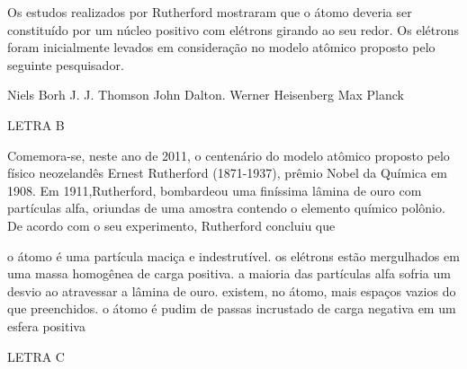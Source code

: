 \documentclass[9qpt]{scrartcl}
\begin{document}
\begin{exercise}[points=1.0]
Os estudos realizados por Rutherford mostraram que o átomo deveria ser constituído por um núcleo positivo com elétrons girando ao seu redor. Os elétrons foram inicialmente levados em consideração no modelo atômico proposto pelo seguinte pesquisador.

\begin{choice}
\choice  Niels Borh
\choice J. J. Thomson
\choice John Dalton.
\choice  Werner Heisenberg
\choice Max Planck
\end{choice}
\end{exercise}
\begin{solution}
LETRA B
\end{solution}


\begin{exercise}[points=1.0]
Comemora-se, neste ano de 2011, o centenário do modelo atômico proposto pelo
físico neozelandês Ernest Rutherford (1871-1937), prêmio Nobel da Química em 1908. Em 1911,Rutherford, bombardeou uma finíssima lâmina de ouro com partículas alfa, oriundas de uma amostra contendo o elemento químico polônio. De acordo com o seu experimento, Rutherford concluiu que

\begin{choice}
\choice o átomo é uma partícula maciça e indestrutível.
\choice os elétrons estão mergulhados em uma massa homogênea de carga positiva.
\choice a maioria das partículas alfa sofria um desvio ao atravessar a lâmina de ouro.
\choice existem, no átomo, mais espaços vazios do que preenchidos.
\choice o átomo é pudim de passas incrustado de carga negativa em um esfera positiva
\end{choice}
\end{exercise}
\begin{solution}
LETRA C
\end{solution}
\end{document}
